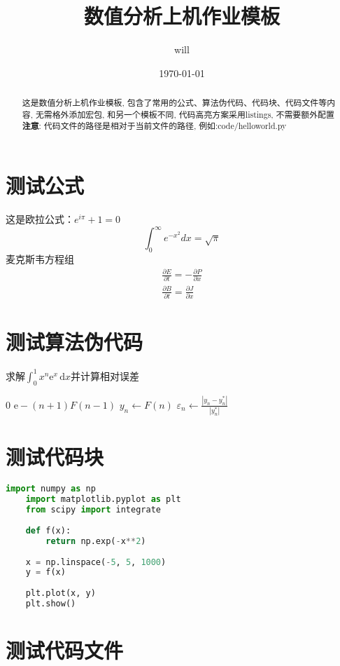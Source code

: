 \documentclass[11pt,a4paper]{TGNAN}
\title{\textbf{数值分析上机作业模板}}
\author{will}
\date{\today}
\begin{document}
\maketitle
\begin{abstract}
    这是数值分析上机作业模板,
    包含了常用的公式、算法伪代码、代码块、代码文件等内容,
    无需格外添加宏包,
    和另一个模板不同,
    代码高亮方案采用listings,
    不需要额外配置\\
    \textbf{注意}:
        代码文件的路径是相对于当前文件的路径, 例如:code/helloworld.py
\end{abstract}
\section{测试公式}
这是欧拉公式：$e^{i\pi}+1=0$
$$
\int_{0}^{\infty} e^{-x^2} dx = \sqrt{\pi}
$$
麦克斯韦方程组
$$
\begin{aligned}
    \frac{\partial E}{\partial t} = -\frac{\partial P}{\partial x} \\
\frac{\partial B}{\partial t} = \frac{\partial J}{\partial x}
\end{aligned}
$$
\section{测试算法伪代码}
\begin{algorithm}
    \caption{求解$\int_{0}^{1}x^n \mathrm{e}^x \,  \mathrm{d}x$并计算相对误差}
    \label{alg:2}
    \begin{algorithmic}[1]
                \State \Return $0$
            \Else
                \State \Return $\mathrm{e} -(n+1)F(n-1)$
            \EndIf
        \EndFunction
        \State $y_n \gets F(n)$
        \State $\varepsilon_n \gets \frac{|y_n - y_n^*|}{|y_n^*|}$
    \end{algorithmic}
\end{algorithm}

\section{测试代码块}

\begin{lstlisting}[language=Python]
    import numpy as np
    import matplotlib.pyplot as plt
    from scipy import integrate
    
    def f(x):
        return np.exp(-x**2)
    
    x = np.linspace(-5, 5, 1000)
    y = f(x)
    
    plt.plot(x, y)
    plt.show()
\end{lstlisting}

\section{测试代码文件}


\end{document}
